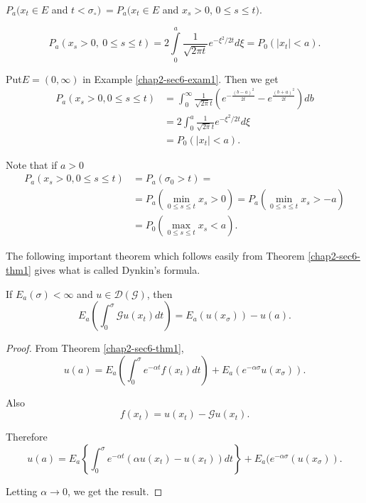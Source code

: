 \begin{remark*}
$P_a (x_t \in E$ and $t < \sigma_\circ ) ~ = P_a (x_t \in E$ and
  $x_s > 0$, \break $0 \leq s \leq t )$. 
\end{remark*}

\begin{exam}\label{chap2-sec6-exam2}%
$$
P_a (x_s > 0, ~ 0 \leq s \leq t) = 2 \int \limits^{a}_{0}
\frac{1}{\sqrt{2 \pi t}} e^{- \xi^2 /2t} d \xi = P_0 (|x_t| < a ). 
$$
\end{exam}

Put\pageoriginale $E = (0, \infty)$ in Example
\ref{chap2-sec6-exam1}. Then we get 
\begin{align*}
  P_a (x_s > 0, 0 \le s \le t) & = \int^\infty_0 \frac{1}{\sqrt{2 \pi}
      t} \left(e ^{-\frac{(b-a)^2}{2t}} -e^{\frac{(b+a)^2}{2t}}\right) db\\ 
  & = 2 \int^a_0 \frac{1}{\sqrt{2 \pi} t} e^{-\xi^2 /2t}{{d \xi}} \\
  & = P_0 (|x_t| < a).
\end{align*}

Note that  if $a > 0$
\begin{align*}
  P_a (x_s > 0,0 \le s \le t) & = P_a (\sigma_0 > t)=\\
  & = P_a \left(\min_{0 \le s \le t} x_s >0\right)= P_a \left(\min_{0 \le s
    \le t} x_s > -a\right)\\ 
  & = P_0 \left(\max_{0 \le s \le t} x_s < a\right).
\end{align*}

The following important theorem which follows easily from Theorem
\ref{chap2-sec6-thm1} 
gives what is called Dynkin's formula. 

\begin{thm}\label{chap2-sec6-thm3}%
  If  $E_a (\sigma) < \infty$ and $u \in \mathscr{D}
  (\mathscr{G})$, then 
  $$
  E_a \left(\int^\sigma_0 \mathscr{G} u (x_t) dt\right) = E_a (u
  (x_\sigma)) - u(a). 
  $$
\end{thm}

\begin{proof}
  From Theorem \ref{chap2-sec6-thm1},
  $$
  u (a) = E_a \left(\int^\sigma_0 e^{- \alpha t} f (x_t) dt\right) + E_a
  (e^{-\alpha \sigma} u (x_\sigma)). 
  $$

  Also\pageoriginale 
  $$
  f (x_t) = u(x_t) -\mathscr{G} u (x_t). 
  $$
  
  Therefore 
  $$
  u (a) = E_a \left\{ \int^\sigma_0 e^{- \alpha t} (\alpha u (x_t) - u
  (x_t)) dt \right\} + E_a (e^{-\alpha \sigma} (u (x_\sigma)). 
  $$
  
  Letting $\alpha \to 0$, we get the result.
\end{proof}

